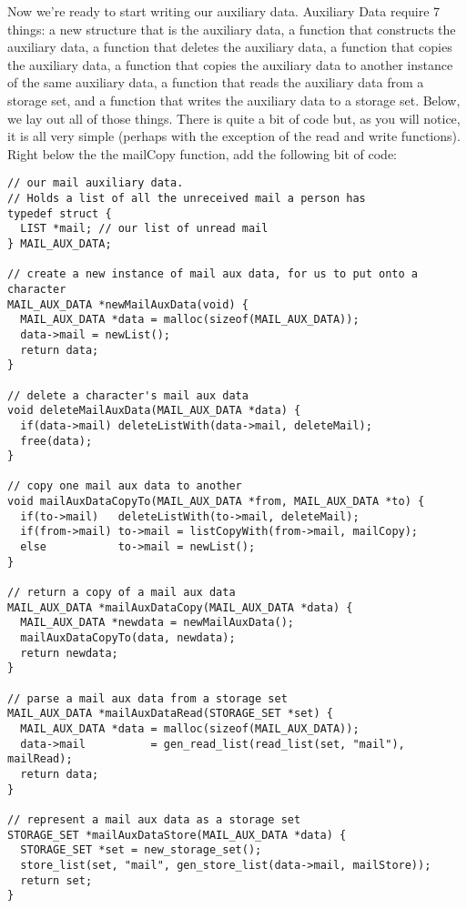 \documentclass[12pt]{article}
\begin{document}
Now we're ready to start writing our auxiliary data. Auxiliary Data require 7 things: a new structure that is the auxiliary data, a function that constructs the auxiliary data, a function that deletes the auxiliary data, a function that copies the auxiliary data, a function that copies the auxiliary data to another instance of the same auxiliary data, a function that reads the auxiliary data from a storage set, and a function that writes the auxiliary data to a storage set. Below, we lay out all of those things. There is quite a bit of code but, as you will notice, it is all very simple (perhaps with the exception of the read and write functions). Right below the the mailCopy function, add the following bit of code:

{\bf \begin{verbatim}
// our mail auxiliary data. 
// Holds a list of all the unreceived mail a person has
typedef struct {
  LIST *mail; // our list of unread mail
} MAIL_AUX_DATA;

// create a new instance of mail aux data, for us to put onto a character
MAIL_AUX_DATA *newMailAuxData(void) {
  MAIL_AUX_DATA *data = malloc(sizeof(MAIL_AUX_DATA));
  data->mail = newList();
  return data;
}

// delete a character's mail aux data
void deleteMailAuxData(MAIL_AUX_DATA *data) {
  if(data->mail) deleteListWith(data->mail, deleteMail);
  free(data);
}

// copy one mail aux data to another
void mailAuxDataCopyTo(MAIL_AUX_DATA *from, MAIL_AUX_DATA *to) {
  if(to->mail)   deleteListWith(to->mail, deleteMail);
  if(from->mail) to->mail = listCopyWith(from->mail, mailCopy);
  else           to->mail = newList();
}

// return a copy of a mail aux data
MAIL_AUX_DATA *mailAuxDataCopy(MAIL_AUX_DATA *data) {
  MAIL_AUX_DATA *newdata = newMailAuxData();
  mailAuxDataCopyTo(data, newdata);
  return newdata;
}

// parse a mail aux data from a storage set
MAIL_AUX_DATA *mailAuxDataRead(STORAGE_SET *set) {
  MAIL_AUX_DATA *data = malloc(sizeof(MAIL_AUX_DATA));
  data->mail          = gen_read_list(read_list(set, "mail"), mailRead);
  return data;
}

// represent a mail aux data as a storage set
STORAGE_SET *mailAuxDataStore(MAIL_AUX_DATA *data) {
  STORAGE_SET *set = new_storage_set();
  store_list(set, "mail", gen_store_list(data->mail, mailStore));
  return set;
}
\end{verbatim}}
\end{document}
